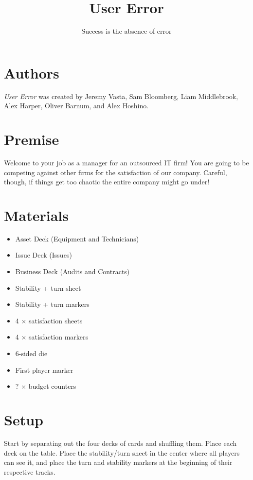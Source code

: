 \documentclass[twocolumn]{article}
\title{User Error}
\author{Success is the absence of error}
\date{}
\begin{document}
\maketitle

\section*{Authors}

\emph{User Error} was created by Jeremy Vasta, Sam Bloomberg, Liam Middlebrook, Alex Harper, Oliver Barnum, and Alex Hoshino.

\section*{Premise}

Welcome to your job as a manager for an outsourced IT firm! You are going to be competing against other firms for the satisfaction of our company. Careful, though, if things get too chaotic the entire company might go under!

\section*{Materials}

\begin{itemize}
	\item Asset Deck (Equipment and Technicians)
	\item Issue Deck (Issues)
	\item Business Deck (Audits and Contracts)
	\item Stability + turn sheet
	\item Stability + turn markers
	\item 4 $\times$ satisfaction sheets
	\item 4 $\times$ satisfaction markers
	\item 6-sided die
	\item First player marker
	\item ? $\times$ budget counters
\end{itemize}

\pagebreak

\section*{Setup}

Start by separating out the four decks of cards and shuffling them. Place each deck on the table. Place the stability/turn sheet in the center where all players can see it, and place the turn and stability markers at the beginning of their respective tracks.
\end{document}
